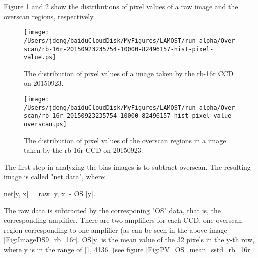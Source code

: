 \documentclass[12pt,twoside,letterpaper]{article}
\begin{document}
Figure \ref{Fig:PV_rb_16r} and \ref{Fig:PV_OS_rb_16r} show the
distributions of pixel values of a raw image and the overscan regions, respectively.  

   \begin{figure}[!htbp]
   \begin{center}
       \texttt{[image: /Users/jdeng/baiduCloudDisk/MyFigures/LAMOST/run\_alpha/Overscan/rb-16r-20150923235754-10000-82496157-hist-pixel-value.ps]}
       \caption{The distribution of pixel values of a image taken by the rb-16r CCD on 20150923.}
       \label{Fig:PV_rb_16r}
   \end{center}    
   \end{figure}

   \begin{figure}[!htbp]
   \begin{center}
       \texttt{[image: /Users/jdeng/baiduCloudDisk/MyFigures/LAMOST/run\_alpha/Overscan/rb-16r-20150923235754-10000-82496157-hist-pixel-value-overscan.ps]}
       \caption{The distribution of pixel values of the overscan regions in a image taken by the rb-16r CCD on 20150923.}
       \label{Fig:PV_OS_rb_16r}
   \end{center}    
   \end{figure}
The first step in analyzing the bias images is to subtract overscan. 
The resulting image is called "net data", where: 

net[y, x]  = raw [y, x]  - OS [y]. 

The raw data is subtracted by the corresponing "OS" data, that is, the
corresponding amplifier. There are two amplifiers for each CCD, one
overscan region corresponding to one amplifier (as can be seen in the
above image \ref{Fig:ImageDS9_rb_16r}. 
OS[y] is the mean value of the 32 pixels in the y-th row, where y is
in the range of [1, 4136] (see figure \ref{Fig:PV_OS_mean_sstd_rb_16r}. 
\end{document}
